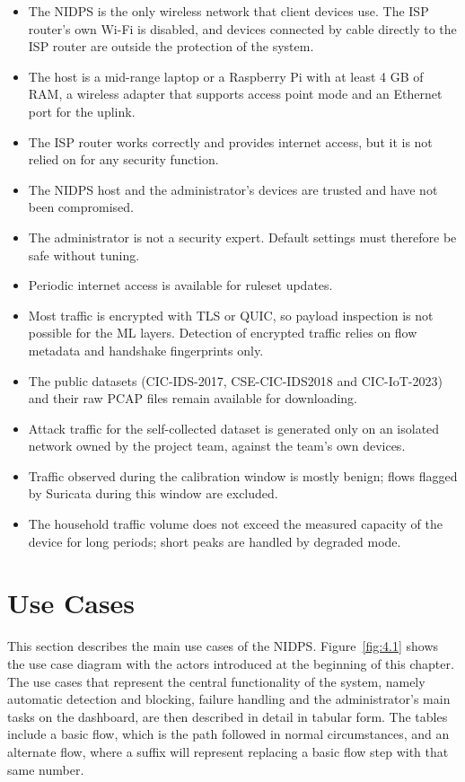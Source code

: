 \begin{itemize}
\item The NIDPS is the only wireless network that client devices use. The ISP router's own Wi-Fi is disabled, and devices connected by cable directly to the ISP router are outside the protection of the system.
\item The host is a mid-range laptop or a Raspberry Pi with at least 4 GB of RAM, a wireless adapter that supports access point mode and an Ethernet port for the uplink.
\item The ISP router works correctly and provides internet access, but it is not relied on for any security function.
\item The NIDPS host and the administrator's devices are trusted and have not been compromised.
\item The administrator is not a security expert. Default settings must therefore be safe without tuning.
\item Periodic internet access is available for ruleset updates.
\item Most traffic is encrypted with TLS or QUIC, so payload inspection is not possible for the ML layers. Detection of encrypted traffic relies on flow metadata and handshake fingerprints only.
\item The public datasets (CIC-IDS-2017, CSE-CIC-IDS2018 and CIC-IoT-2023) and their raw PCAP files remain available for downloading.
\item Attack traffic for the self-collected dataset is generated only on an isolated network owned by the project team, against the team's own devices.
\item Traffic observed during the calibration window is mostly benign; flows flagged by Suricata during this window are excluded.
\item The household traffic volume does not exceed the measured capacity of the device for long periods; short peaks are handled by degraded mode.
\end{itemize}

\section{Use Cases}\label{sec:4.6}

\noindent This section describes the main use cases of the NIDPS. Figure~\ref{fig:4.1} shows the use case diagram with the actors introduced at the beginning of this chapter. The use cases that represent the central functionality of the system, namely automatic detection and blocking, failure handling and the administrator's main tasks on the dashboard, are then described in detail in tabular form. The tables include a basic flow, which is the path followed in normal circumstances, and an alternate flow, where a suffix will represent replacing a basic flow step with that same number.

